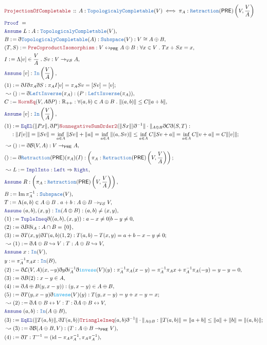 \documentclass[12pt]{scrartcl}
\newcommand{\TYPE}[1]{\textcolor{NavyBlue}{\mathtt{#1}}}
\newcommand{\FUNC}[1]{\textcolor{Cerulean}{\mathtt{#1}}}
\newcommand{\LOGIC}[1]{\textcolor{Blue}{\mathtt{#1}}}
\newcommand{\THM}[1]{\textcolor{Maroon}{\mathtt{#1}}}
\renewcommand{\.}{\; . \;}
\newcommand{\de}{: \kern 0.1pc =}
\newcommand{\Theorem}[2]{& \THM{#1} \, :: \, #2 \\ & \Proof = \\ }
\newcommand{\NewLine}{\\ & \kern 1pc}
\newcommand{\Page}[1]{\begin{align*} #1 \end{align*} \newpage   }
\newcommand{ \bd }{ \ByDef }
\newcommand{\Reals}{\mathbb{R} }
\DeclareMathOperator*{\im}{Im}
\newcommand{\ToInj}{\hookrightarrow}
\newcommand{\ToBij}{\leftrightarrow}
\newcommand{\Say}[3]{& #1 \de #2 : #3, \\}
\newcommand{\Conclude}[3]{& #1 \de #2 : #3; \\}
\newcommand{\Derive}[3]{& \leadsto #1 \de #2 : #3, \\}
\newcommand{\A}{\LOGIC{Assume} \;}
\newcommand{\Assume}[2]{& \A #1 : #2, \\}
\newcommand{\ByDef}{\eth}
\newcommand{\Proof}{\LOGIC{Proof} \; }
\newcommand{\PRE}{\mathsf{PRE}} %
\newcommand{\B}{\mathcal{B}}
\begin{document}
\Page{
  \Theorem{ProjectionOfCompletable}{ A :  \TYPE{TopologicalyCompletable}(V) \iff \pi_A : \TYPE{Retraction}(\PRE)\left(V, \frac{V}{A}\right) }
\Assume{L}{A :  \TYPE{TopologicalyCompletable}(V)}
\Say{B}{\bd \TYPE{TopologicalyCompletable}(A) }{ \TYPE{Subspace}(V) : V \cong A \oplus B }
\Say{(T,S)}{\THM{PreCoproductIsomorphism}}{ V \ToBij_\PRE A \oplus B : \forall x \in V \. Tx + Sx = x }
\Say{I}{ \Lambda [v] \in  \frac{V}{A} \. Sv   }{ V \to_{\mathcal{VS}}  A}
\Assume{[v]}{\TYPE{In} \left( \frac{V}{A} \right)}
\Conclude{(1)}{ \bd I \bd \pi_A \bd S}{  \pi_A I[v] = \pi_A Sv = [Sv] = [v]}
\Derive{()}{ \bd \TYPE{LeftInverse}(\pi_A)}{ (P : \TYPE{LeftInverse}(\pi_A))  }
\Say{C}{\THM{NormEq}(V,A \bd P)}{ \Reals_{++} : \forall (a,b) \in A \oplus B \. \| (a,b) \| \le C \| a + b \| }
\Assume{ [v] }{\TYPE{In}\left( \frac{V}{A} \right)} 
\Conclude{(1)}{ \LOGIC{EqEl}(\| Px \|, \bd P) \THM{NonnegativeSumOrder2}(\|Sx\|)\bd^{-1}\| \cdot \|_{A \oplus B} \bd C \bd (S,T) : \NewLine
}{ \| I[v] \| = \| Sv \| = \inf_{a \in A} \| Sv \|  + \| a \| =  \inf_{a \in A} \|  (a , Sv)   \| 
 \le \inf_{a \in A} C\| Sv   + a   \|      
 = \inf_{a \in A} C\| v + a \| = C\| [v] \| }
\Derive{()}{ \bd\B(V,A) }{ V \to_{\PRE} A}
\Conclude{()}{\bd \TYPE{Retraction}(\PRE)(\pi_A)(I)}{\left(\pi_A : \TYPE{Retraction}(\PRE)\left(V, \frac{V}{A}\right) \right)}
\Derive{L}{\LOGIC{ImplInto}}{ \LOGIC{Left} \Rightarrow \LOGIC{Right} }
 \Assume{R}{ \left(\pi_A : \TYPE{Retraction}(\PRE)\left(V, \frac{V}{A}\right) \right) }
 \Say{B}{\im \pi_A^{-1}}{ \TYPE{Subspace}(V) }
 \Say{T}{ \Lambda (a,b) \in A \oplus B \. a + b }{ A \oplus B \to_{\mathcal{VS}} V  }
 \Assume{(a,b),(x,y)}{ \TYPE{In}(A \oplus B) : (a,b) \neq (x,y)}
 \Say{(1)}{ \LOGIC{TupleIneq}{\bd ((a,b),(x,y))} }{ a - x \neq 0 | b - y \neq 0 }
 \Say{(2)}{ \bd B \bd i_A }{ A \cap B = \{ 0 \} }
 \Conclude{(3)}{  \bd T (x,y)\bd T(a,b) (1,2)   }{ T(a,b) - T(x,y) = a + b - x - y \neq 0  }
 \Derive{(1)}{\bd A \oplus B \ToInj V}{ T :   A \oplus B \ToInj V}
 \Assume{x}{\TYPE{In}(V)}
 \Say{y}{ \pi_A^{-1} \pi_A x }{\TYPE{In}(B)}
 \Say{(2)}{ \bd \mathcal{L}(V,A)(x,-y) \bd y \bd i^{-1}_A \bd \FUNC{invese}(V)(y) }
 { \pi_A^{-1} \pi_A(x -y) = \pi_A^{-1}\pi_A x + \pi_A^{-1} \pi_A( -y) = y - y = 0  }
 \Say{(3)}{ \bd B (2) }{ x - y \in A }
 \Say{ (4)  }{\bd A \oplus B(y,x -y))}{ (y,x - y) \in A \oplus B }
 \Conclude{ (5) }{ \bd T(y, x -y)\bd \FUNC{invese}(V)(y)}{ T(y, x - y) = y + x -y = x }
 \Derive{ (2) }{ \bd A \oplus B \ToBij V}{ T : \bd A \oplus B \ToBij V }
 \Assume{ (a,b) }{ \TYPE{In}( A \oplus B )   }
 \Conclude{ (3) }{ \LOGIC{EqEl}(\| T(a,b) \|, \bd T(a,b) )\THM{TriangleIneq}(a,b)\bd^{-1} 
 \| \cdot \|_{ A \oplus B } }
 {  \| T(a,b) \| = \|  a + b  \| \le \| a \| + \| b \| = \|(a,b)\| }
 \Derive{ (3) }{ \bd \B(A \oplus B, V) }{ (T : A \oplus B \to_\PRE   V )} 
 \Say{(4)}{ \bd T }{ T^{-1} = ( \mathrm{id} -  \pi_A \pi^{-1}_A ,  \pi_A \pi^{-1}_A )}
 }
\end{document}
